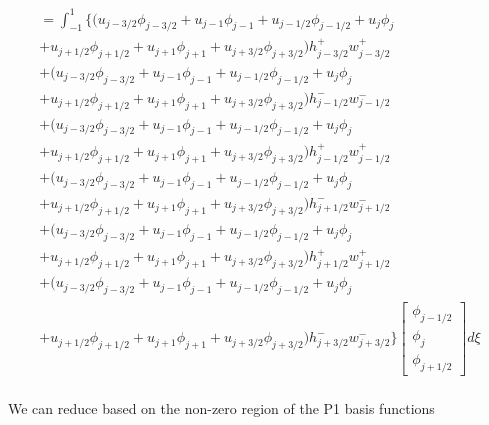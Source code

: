 \documentclass[12pt]{article}
\begin{document}
\begin{multline*}
= \int_{-1}^{1}  \bigg\lbrace \bigg(u_{j - 3/2}\phi_{j - 3/2} + u_{j - 1}\phi_{j - 1} + u_{j - 1/2}\phi_{j - 1/2} + u_{j}\phi_{j }\\ + u_{j + 1/2}\phi_{j + 1/2} + u_{j + 1}\phi_{j + 1} + u_{j + 3/2}\phi_{j + 3/2}\bigg)h^+_{j - 3/2}w^+_{j - 3/2}
\\ +\bigg(u_{j - 3/2}\phi_{j - 3/2} + u_{j - 1}\phi_{j - 1} + u_{j - 1/2}\phi_{j - 1/2} + u_{j}\phi_{j }\\ + u_{j + 1/2}\phi_{j + 1/2} + u_{j + 1}\phi_{j + 1} + u_{j + 3/2}\phi_{j + 3/2}\bigg)h^-_{j - 1/2}w^-_{j - 1/2}
\\ +\bigg(u_{j - 3/2}\phi_{j - 3/2} + u_{j - 1}\phi_{j - 1} + u_{j - 1/2}\phi_{j - 1/2} + u_{j}\phi_{j }\\ + u_{j + 1/2}\phi_{j + 1/2} + u_{j + 1}\phi_{j + 1} + u_{j + 3/2}\phi_{j + 3/2}\bigg)h^+_{j - 1/2}w^+_{j - 1/2}
\\ +\bigg(u_{j - 3/2}\phi_{j - 3/2} + u_{j - 1}\phi_{j - 1} + u_{j - 1/2}\phi_{j - 1/2} + u_{j}\phi_{j }\\ + u_{j + 1/2}\phi_{j + 1/2} + u_{j + 1}\phi_{j + 1} + u_{j + 3/2}\phi_{j + 3/2}\bigg)h^-_{j + 1/2}w^-_{j + 1/2} 
\\ +\bigg(u_{j - 3/2}\phi_{j - 3/2} + u_{j - 1}\phi_{j - 1} + u_{j - 1/2}\phi_{j - 1/2} + u_{j}\phi_{j }\\ + u_{j + 1/2}\phi_{j + 1/2} + u_{j + 1}\phi_{j + 1} + u_{j + 3/2}\phi_{j + 3/2}\bigg)h^+_{j + 1/2}w^+_{j + 1/2} 
\\ +\bigg(u_{j - 3/2}\phi_{j - 3/2} + u_{j - 1}\phi_{j - 1} + u_{j - 1/2}\phi_{j - 1/2} + u_{j}\phi_{j }\\ + u_{j + 1/2}\phi_{j + 1/2} + u_{j + 1}\phi_{j + 1} + u_{j + 3/2}\phi_{j + 3/2}\bigg)h^-_{j + 3/2}w^-_{j + 3/2}\bigg\rbrace \left[\begin{array}{c}\phi_{j-1/2} \\\phi_{j}\\\phi_{j+1/2} \end{array}\right] d\xi\\ 
\end{multline*}

We can reduce based on the non-zero region of the P1 basis functions
\end{document}
